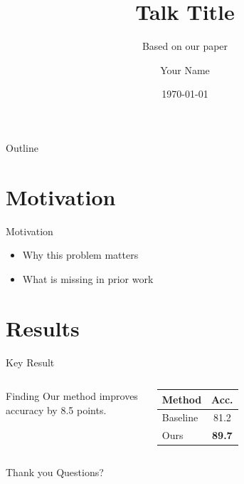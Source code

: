 \documentclass{beamer}
\title{Talk Title}
\subtitle{Based on our paper}
\author{Your Name}
\institute{Your University}
\date{\today}
\begin{document}
\begin{frame}
  \titlepage
\end{frame}

\begin{frame}{Outline}
  \tableofcontents
\end{frame}

\section{Motivation}
\begin{frame}{Motivation}
  \begin{itemize}
    \item Why this problem matters
    \item What is missing in prior work
  \end{itemize}
\end{frame}

\section{Results}
\begin{frame}{Key Result}
  \begin{columns}
      \begin{block}{Finding}
        Our method improves accuracy by 8.5 points.
      \end{block}
      \centering
      \begin{tabular}{lc}
        \toprule
        Method & Acc. \\
        \midrule
        Baseline & 81.2 \\
        Ours & \textbf{89.7} \\
        \bottomrule
      \end{tabular}
  \end{columns}
\end{frame}

\begin{frame}{Thank you}
  \centering Questions?
\end{frame}
\end{document}
